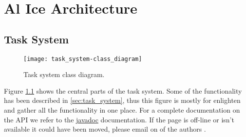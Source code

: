 \chapter{Al Ice Architecture}
\label{sec:architecture}

\section{Task System}
\begin{figure}[tbh]
\centering
\caption{Task system class diagram.}
\label{fig:task_system_class_diagram}
\texttt{[image: task\_system-class\_diagram]}
\end{figure}
Figure \ref{fig:task_system_class_diagram} shows the central parts of the task system. Some of the
functionality has been described in \ref{sec:task_system}, thus this figure is mostly for
enlighten and gather all the functionality in one place. For a complete documentation on the API we
refer to the \href{http://alice.dmgame.org/doxygen/}{javadoc} documentation. If the page is off-line
or isn't available it could have been moved, please email on of the authors \authornames.
